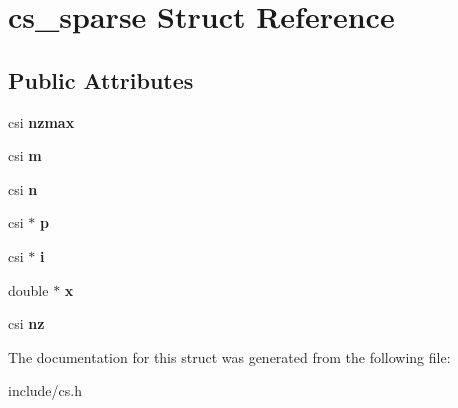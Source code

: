 \hypertarget{structcs__sparse}{\section{cs\+\_\+sparse Struct Reference}
\label{structcs__sparse}
}
\subsection*{Public Attributes}
\begin{DoxyCompactItemize}
\item 
\hypertarget{structcs__sparse_a4d98fb7ac430adab928f42e45d7c5504}{csi {\bfseries nzmax}}\label{structcs__sparse_a4d98fb7ac430adab928f42e45d7c5504}

\item 
\hypertarget{structcs__sparse_a8dab81f7d781bd65c7cb4f103db87ade}{csi {\bfseries m}}\label{structcs__sparse_a8dab81f7d781bd65c7cb4f103db87ade}

\item 
\hypertarget{structcs__sparse_ad9d0192b240c4ea51984ad0d09f56a02}{csi {\bfseries n}}\label{structcs__sparse_ad9d0192b240c4ea51984ad0d09f56a02}

\item 
\hypertarget{structcs__sparse_a645e83714f71e7ab788ee75c6fc46dac}{csi $\ast$ {\bfseries p}}\label{structcs__sparse_a645e83714f71e7ab788ee75c6fc46dac}

\item 
\hypertarget{structcs__sparse_a95cad038b1ec034f444ab517822040b1}{csi $\ast$ {\bfseries i}}\label{structcs__sparse_a95cad038b1ec034f444ab517822040b1}

\item 
\hypertarget{structcs__sparse_a0d6d06e4893a7d4d86e94ce49358d9c1}{double $\ast$ {\bfseries x}}\label{structcs__sparse_a0d6d06e4893a7d4d86e94ce49358d9c1}

\item 
\hypertarget{structcs__sparse_a8eb7205d5e8fbb0c08a80e9fd52d2963}{csi {\bfseries nz}}\label{structcs__sparse_a8eb7205d5e8fbb0c08a80e9fd52d2963}

\end{DoxyCompactItemize}


The documentation for this struct was generated from the following file\+:\begin{DoxyCompactItemize}
\item 
include/cs.\+h\end{DoxyCompactItemize}
